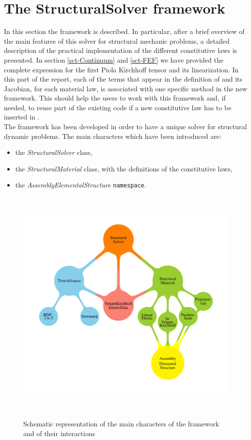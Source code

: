 \section{The StructuralSolver framework}
In this section the \SSol framework is described. In particular, after a brief overview of the main features of this solver for structural mechanic problems, a detailed description of the practical implementation of the different constitutive laws is presented. In section \ref{sct-Continuum} and \ref{sct-FEF} we have provided the complete expression for the first Piola Kirchhoff tensor and its linearization. In this part of the report, each of the terms that appear in the definition of \Piola and its Jacobian, for each material law, is associated with one specific method in the new \SSolNC framework. This should help the users to work with this framework and, if needed, to reuse part of the existing code if a new constitutive law has to be inserted in \LV.\\
The \SSolNC framework has been developed in order to have a unique solver for structural dynamic problems. The main characters which have been introduced are:
\begin{itemize}
  \item the \textit{StructuralSolver} class,
  \item the \textit{StructuralMaterial} class, with the definitions of the constitutive laws,
  \item the \textit{AssemblyElementalStructure} \texttt{namespace}.
\end{itemize}

\begin{figure}[h!]
  \centering
  \includegraphics[width=14cm,height=12cm]{images/DesignStructural.pdf}
  \caption{Schematic representation of the main characters of the \SSol framework and of their interactions}
  \label{fig::design}
\end{figure}
